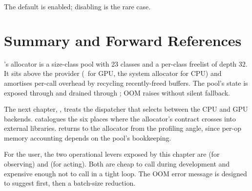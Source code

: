 The default is enabled; disabling is the rare case.

\section{Summary and Forward References}
\label{sec:allocator:summary}

\Lucid's allocator is a size-class pool with 23 classes and a
per-class freelist of depth 32. It sits above the provider
(\MLX\ for GPU, the system allocator for CPU) and amortises
per-call overhead by recycling recently-freed buffers. The pool's
state is exposed through  and drained
through ; OOM raises 
without silent fallback.

The next chapter, , treats the
dispatcher that selects between the CPU and GPU backends.
 catalogues the six places where the
allocator's contract crosses into external libraries.
 returns to the allocator from the
profiling angle, since per-op memory accounting depends on the
pool's bookkeeping.

\begin{lucidtip}
For the user, the two operational levers exposed by this chapter
are  (for observing) and
 (for acting). Both are cheap to call
during development and expensive enough not to call in a tight
loop. The OOM error message is designed to suggest 
first, then a batch-size reduction.
\end{lucidtip}
